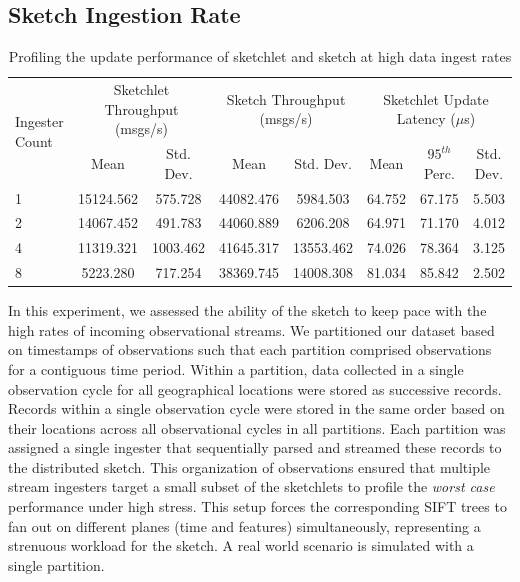 \subsection{Sketch Ingestion Rate}
%
\begin{table}[bh!]
    \renewcommand{\arraystretch}{1.2}
    \caption{Profiling the update performance of sketchlet and sketch at high data ingest rates}
    \label{tab:throughput}
    \begin{center}
        \begin{tabularx}{0.9\textwidth}{|X|c|c|c|c|c|c|c|}
            \hline
            \multirow{2}{*}{Ingester Count} & \multicolumn{2}{c|}{\cellcolor[gray]{0.7}Sketchlet Throughput (msgs/s)} &\multicolumn{2}{c|}{\cellcolor[gray]{0.7}Sketch Throughput (msgs/s)} & \multicolumn{3}{c|}{\cellcolor[gray]{0.7}Sketchlet Update Latency ($\mu$s)} \\
            \cline{2-5}
             & \cellcolor[gray]{0.9}Mean & \cellcolor[gray]{0.9}Std. Dev.  &  \cellcolor[gray]{0.9}Mean & \cellcolor[gray]{0.9}Std. Dev.
             &  \cellcolor[gray]{0.9}Mean & \cellcolor[gray]{0.9}$95^{th}$ Perc. & \cellcolor[gray]{0.9}Std. Dev. \\
            \hline
            1 & 15124.562 & 575.728 & 44082.476 & 5984.503 & 64.752 & 67.175 & 5.503 \\
            \hline
            2 & 14067.452 & 491.783 & 44060.889 & 6206.208 & 64.971 & 71.170 & 4.012 \\
            \hline
            4 & 11319.321 & 1003.462 & 41645.317 & 13553.462 & 74.026 & 78.364 & 3.125 \\
            \hline
            8 & 5223.280 & 717.254 & 38369.745 & 14008.308 & 81.034 & 85.842 & 2.502 \\
            \hline
        \end{tabularx}
    \end{center}
\end{table}
%
In this experiment, we assessed the ability of the sketch to keep pace with the high rates of incoming observational streams.
We partitioned our dataset based on timestamps of observations such that each partition comprised observations for a contiguous time period.
Within a partition, data collected in a single observation cycle for all geographical locations were stored as successive records.
Records within a single observation cycle were stored in the same order based on their locations across all observational cycles in all partitions.
Each partition was assigned a single ingester that sequentially parsed and streamed these records to the distributed sketch.
This organization of observations ensured that multiple stream ingesters target a small subset of the sketchlets to profile the \textit{worst case} performance under high stress.
This setup forces the corresponding SIFT trees to fan out on different planes (time and features) simultaneously, representing a strenuous workload for the sketch.
A real world scenario is simulated with a single partition.

